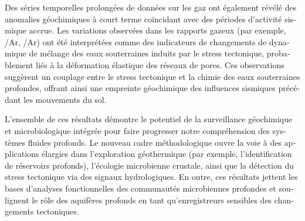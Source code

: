 \begin{otherlanguage}{french}
Des séries temporelles prolongées de données sur les gaz ont également révélé des anomalies géochimiques à court terme coïncidant avec des périodes d’activité sismique accrue.
Les variations observées dans les rapports gazeux (par exemple, /Ar, /Ar) ont été interprétées comme des indicateurs de changements de dynamique de mélange des eaux souterraines induits par le stress tectonique, probablement liés à la déformation élastique des réseaux de pores.
Ces observations suggèrent un couplage entre le stress tectonique et la chimie des eaux souterraines profondes, offrant ainsi une empreinte géochimique des influences sismiques précédant les mouvements du sol.

L’ensemble de ces résultats démontre le potentiel de la surveillance géochimique et microbiologique intégrée pour faire progresser notre compréhension des systèmes fluides profonds.
Le nouveau cadre méthodologique ouvre la voie à des applications élargies dans l’exploration géothermique (par exemple, l’identification de réservoirs profonds), l’écologie microbienne crustale, ainsi que la détection du stress tectonique via des signaux hydrologiques.
En outre, ces résultats jettent les bases d’analyses fonctionnelles des communautés microbiennes profondes et soulignent le rôle des aquifères profonds en tant qu’enregistreurs sensibles des changements tectoniques.

\end{otherlanguage}

\endgroup

\vfill


\cleardoublepage%


\begingroup
\let\clearpage\relax
\let\cleardoublepage\relax
\let\cleardoublepage\relax

